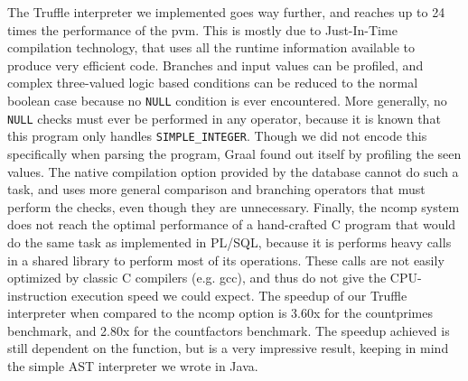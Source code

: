 \documentclass[twoside,11pt,a4paper]{article}
\newcommand{\pls}[1]{\small\texttt{#1}\normalsize}
\newcommand{\plstype}[1]{\pls{#1}}
\newcommand{\simpleint}{\plstype{SIMPLE\_INTEGER}}
\newcommand{\plsnull}{\pls{NULL}}
\newcommand{\benchsystem}[1]{\textsf{#1}}
\newcommand{\pvm}{\benchsystem{pvm}}
\newcommand{\ncomp}{\benchsystem{ncomp}}
\newcommand{\bench}[1]{\textsf{#1}}
\begin{document}
The Truffle interpreter we implemented goes way further, and reaches up to 24 times the performance of the \pvm{}. This is mostly due to Just-In-Time compilation technology, that uses all the runtime information available to produce very efficient code. Branches and input values can be profiled, and complex three-valued logic based conditions can be reduced to the normal boolean case because no \plsnull{} condition is ever encountered. More generally, no \plsnull{} checks must ever be performed in any operator, because it is known that this program only handles \simpleint{}. Though we did not encode this specifically when parsing the program, Graal found out itself by profiling the seen values. The native compilation option provided by the database cannot do such a task, and uses more general comparison and branching operators that must perform the checks, even though they are unnecessary. Finally, the \ncomp{} system does not reach the optimal performance of a hand-crafted C program that would do the same task as implemented in PL/SQL, because it is performs heavy calls in a shared library to perform most of its operations. These calls are not easily optimized by classic C compilers (e.g. gcc), and thus do not give the CPU-instruction execution speed we could expect. The speedup of our Truffle interpreter when compared to the \ncomp{} option is 3.60x for the \bench{countprimes} benchmark, and 2.80x for the \bench{countfactors} benchmark. The speedup achieved is still dependent on the function, but is a very impressive result, keeping in mind the simple AST interpreter we wrote in Java.
\end{document}
